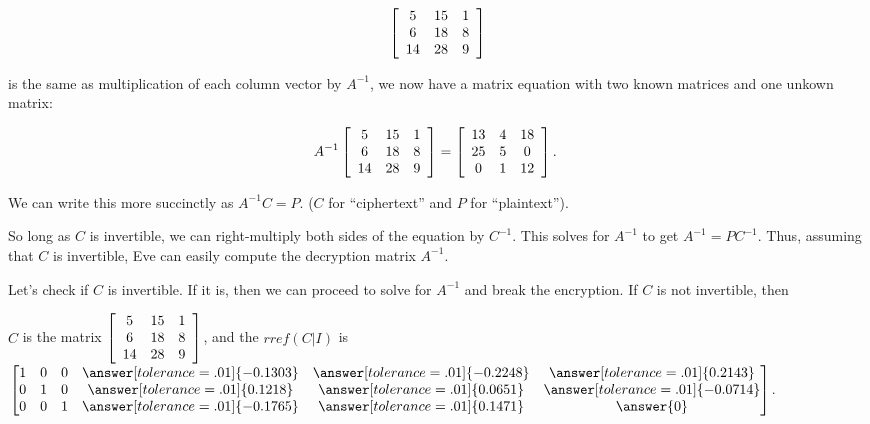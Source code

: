 \documentclass{ximera}
\begin{document}
\begin{example}
  \begin{equation*}
    \startmat{ccc}
      5 & 15 & 1 \\
      6 & 18 & 8 \\
      14 & 28 & 9 \\
    \stopmat
  \end{equation*}

  is the same as multiplication of each column vector by $A^{-1}$, we now have a matrix equation with two known matrices and one unkown matrix:
  
  \begin{equation*}
    A^{-1} \startmat{ccc}
      5 & 15 & 1 \\
      6 & 18 & 8 \\
      14 & 28 & 9 \\
    \stopmat
    = \startmat{ccc}
      13 & 4 & 18 \\
      25 & 5 & 0 \\
      0 & 1 & 12 \\
    \stopmat.\quad
  \end{equation*}

  We can write this more succinctly as $A^{-1}C=P$. ($C$
 for ``ciphertext'' and $P$ for ``plaintext''). 
 
  So long as $C$ is invertible, we can right-multiply 
  both sides of the equation by $C^{-1}$. This solves for $A^{-1}$ to get
  $A^{-1} = PC^{-1}$. Thus, assuming that $C$ is invertible, Eve can
  easily compute the decryption matrix $A^{-1}$. 

  Let's check if $C$ is invertible. If it is, then we can proceed to solve for $A^{-1}$ and break the encryption. If $C$ is not invertible, then 

  $C$ is the matrix $\startmat{ccc}
  5 & 15 & 1 \\
  6 & 18 & 8 \\
  14 & 28 & 9 \\
\stopmat$, and the $rref(C|I)$ is $\begin{bmatrix}
  1&0&0&\answer[tolerance=.01]{-0.1303} & \answer[tolerance=.01]{-0.2248} & \answer[tolerance=.01]{0.2143} \\
  0&1&0 & \answer[tolerance=.01]{0.1218} & \answer[tolerance=.01]{0.0651} & \answer[tolerance=.01]{-0.0714} \\
  0&0&1 & \answer[tolerance=.01]{-0.1765} & \answer[tolerance=.01]{0.1471} & \answer{0}
  \end{bmatrix}$.


\end{example}
\end{document}
